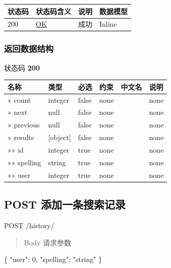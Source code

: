 \documentclass[
]{article}
\newenvironment{Shaded}{}{}
\newcommand{\DataTypeTok}[1]{\textcolor[rgb]{0.56,0.13,0.00}{#1}}
\newcommand{\DecValTok}[1]{\textcolor[rgb]{0.25,0.63,0.44}{#1}}
\newcommand{\FunctionTok}[1]{\textcolor[rgb]{0.02,0.16,0.49}{#1}}
\newcommand{\StringTok}[1]{\textcolor[rgb]{0.25,0.44,0.63}{#1}}
\begin{document}
\begin{longtable}[]{@{}llll@{}}
\toprule
状态码 & 状态码含义 & 说明 & 数据模型 \\
\midrule
\endhead
200 & \href{https://tools.ietf.org/html/rfc7231\#section-6.3.1}{OK} &
成功 & Inline \\
\bottomrule
\end{longtable}

\hypertarget{ux8fd4ux56deux6570ux636eux7ed3ux6784-28}{%
\subsubsection{返回数据结构}\label{ux8fd4ux56deux6570ux636eux7ed3ux6784-28}}

状态码 \textbf{200}

\begin{longtable}[]{@{}llllll@{}}
\toprule
名称 & 类型 & 必选 & 约束 & 中文名 & 说明 \\
\midrule
\endhead
» count & integer & false & none & & none \\
» next & null & false & none & & none \\
» previous & null & false & none & & none \\
» results & {[}object{]} & false & none & & none \\
»» id & integer & true & none & & none \\
»» spelling & string & true & none & & none \\
»» user & integer & true & none & & none \\
\bottomrule
\end{longtable}

\hypertarget{post-ux6dfbux52a0ux4e00ux6761ux641cux7d22ux8bb0ux5f55}{%
\subsection{POST
添加一条搜索记录}\label{post-ux6dfbux52a0ux4e00ux6761ux641cux7d22ux8bb0ux5f55}}

POST /history/

\begin{quote}
Body 请求参数
\end{quote}

\begin{Shaded}
\begin{Highlighting}[]
\FunctionTok{\{}
  \DataTypeTok{"user"}\FunctionTok{:} \DecValTok{0}\FunctionTok{,}
  \DataTypeTok{"spelling"}\FunctionTok{:} \StringTok{"string"}
\FunctionTok{\}}
\end{Highlighting}
\end{Shaded}
\end{document}
